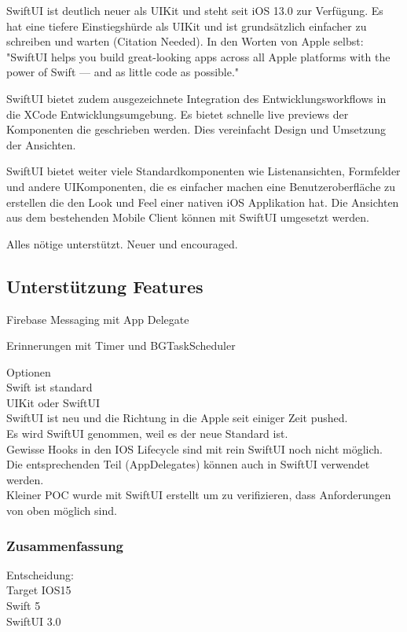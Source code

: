 SwiftUI ist deutlich neuer als UIKit und steht seit iOS 13.0 zur Verfügung.
Es hat eine tiefere Einstiegshürde als UIKit und ist grundsätzlich einfacher zu schreiben und warten (Citation Needed).
In den Worten von Apple selbst: "SwiftUI helps you build great-looking apps across all Apple platforms with the power of Swift — and as little code as possible."\cite{ios_swift_ui}

SwiftUI bietet zudem ausgezeichnete Integration des Entwicklungsworkflows in die XCode Entwicklungsumgebung.
Es bietet schnelle live previews der Komponenten die geschrieben werden.
Dies vereinfacht Design und Umsetzung der Ansichten.

SwiftUI bietet weiter viele Standardkomponenten wie Listenansichten, Formfelder und andere UIKomponenten, die es einfacher machen
eine Benutzeroberfläche zu erstellen die den Look und Feel einer nativen iOS Applikation hat.
Die Ansichten aus dem bestehenden Mobile Client können mit SwiftUI umgesetzt werden.





Alles nötige unterstützt.
Neuer und encouraged.


\subsection*{Unterstützung Features}

Firebase Messaging mit App Delegate \cite{firebase_ios}

Erinnerungen mit Timer\cite{ios_timer} und BGTaskScheduler\cite{ios_bgtaskscheduler}


Optionen \\

Swift ist standard \\
UIKit oder SwiftUI \\

SwiftUI ist neu und die Richtung in die Apple seit einiger Zeit pushed. \\
Es wird SwiftUI genommen, weil es der neue Standard ist. \\
Gewisse Hooks in den IOS Lifecycle sind mit rein SwiftUI noch nicht möglich. \\
Die entsprechenden Teil (AppDelegates) können auch in SwiftUI verwendet werden. \\

Kleiner POC wurde mit SwiftUI erstellt um zu verifizieren, dass Anforderungen von oben möglich sind. \\

\subsubsection*{Zusammenfassung}

Entscheidung: \\

Target IOS15 \\
Swift 5 \\
SwiftUI 3.0 \\

\clearpage
